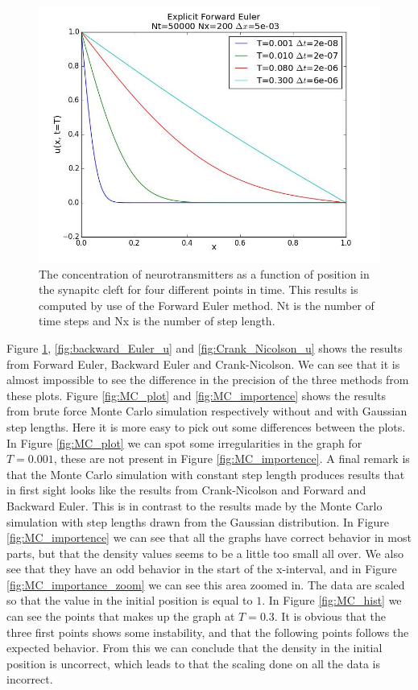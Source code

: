 \documentclass[12pt]{article}
\begin{document}
\begin{flushleft}
\begin{figure}[!h]
\begin{center}
\includegraphics[scale=0.4]{EF_Nt5000_Nx200}
\caption{\label{fig:forward_Euler_u}The concentration of neurotransmitters as a function of position in the synapitc cleft for four different points in time. This results is computed by use of the Forward Euler method. Nt is the number of time steps and Nx is the number of step length.}
\end{center}
\end{figure}



Figure \ref{fig:forward_Euler_u}, \ref{fig:backward_Euler_u} and \ref{fig:Crank_Nicolson_u} shows the results from Forward Euler, Backward Euler and Crank-Nicolson. We can see that it is almost impossible to see the difference in the precision of the three methods from these plots. Figure \ref{fig:MC_plot} and \ref{fig:MC_importence} shows the results from brute force Monte Carlo simulation respectively without and with Gaussian step lengths. Here it is more easy to pick out some differences between the plots. In Figure \ref{fig:MC_plot} we can spot some irregularities in the graph for $T=0.001$, these are not present in Figure \ref{fig:MC_importence}. A final remark is that the Monte Carlo simulation with constant step length produces results that in first sight looks like the results from Crank-Nicolson and Forward and Backward Euler. This is in contrast to the results made by the Monte Carlo simulation with step lengths drawn from the Gaussian distribution. In Figure \ref{fig:MC_importence} we can see that all the graphs have correct behavior in most parts, but that the density values seems to be a little too small all over. We also see that they have an odd behavior in the start of the x-interval, and in Figure \ref{fig:MC_importance_zoom} we can see this area zoomed in. The data are scaled so that the value in the initial position is equal to $1$. In Figure \ref{fig:MC_hist} we can see the points that makes up the graph at $T=0.3$. It is obvious that the three first points shows some instability, and that the following points follows the expected behavior. From this we can conclude that the density in the initial position is uncorrect, which leads to that the scaling done on all the data is incorrect.


\end{flushleft}
\end{document}
